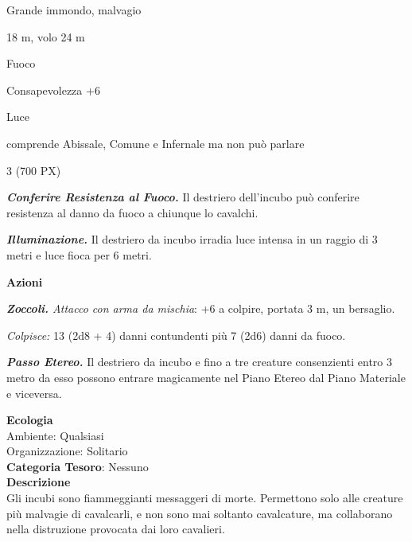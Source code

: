 \begin{multicols}{2}
{
\begin{description}[noitemsep, topsep=0pt, parsep=0pt, partopsep=0pt, itemsep=1pt, leftmargin=2.35cm,  labelwidth=2.2cm, itemindent=0cm, listparindent=0pt] %
\setlength{\baselineskip}{10pt}
\item[\textbf{Taglia/Tipo}] Grande immondo, malvagio
\item[\textbf{Caratt.}] 
\item[\textbf{Punti Ferita}] 
\item[\textbf{Movimento}] 18 m, volo 24 m
\item[\textbf{Tiri Salvez.}] 
\item[\textbf{Imm. Danni}] Fuoco
\item[\textbf{Comp.}] Consapevolezza +6
\item[\textbf{Vulnerabilità}] Luce
\item[\textbf{Sensi}] 
\item[\textbf{Linguaggi}] comprende Abissale, Comune e Infernale ma non può parlare
\item[\textbf{Sfida}] 3 (700 PX)
\end{description}
\smallskip

\emph{\textbf{Conferire Resistenza al Fuoco.}} Il destriero dell'incubo può conferire resistenza al danno da fuoco a chiunque lo cavalchi.

\emph{\textbf{Illuminazione.}} Il destriero da incubo irradia luce intensa in un raggio di 3 metri e luce fioca per 6 metri.

\textbf{Azioni}

\emph{\textbf{Zoccoli.} Attacco con arma da mischia}: +6 a colpire, portata 3 m, un bersaglio.

\emph{Colpisce:} 13 (2d8 + 4) danni contundenti più 7 (2d6) danni da fuoco.

\emph{\textbf{Passo Etereo.}} Il destriero da incubo e fino a tre creature consenzienti entro 3 metro da esso possono entrare magicamente nel Piano Etereo dal Piano Materiale e viceversa.

\textbf{Ecologia}\\
Ambiente: Qualsiasi\\
Organizzazione: Solitario\\
\textbf{Categoria Tesoro}: Nessuno\\
\textbf{Descrizione}\\
Gli incubi sono fiammeggianti messaggeri di morte. Permettono solo alle creature più malvagie di cavalcarli, e non sono mai soltanto cavalcature, ma collaborano nella distruzione provocata dai loro cavalieri.

}
\end{multicols}
